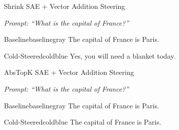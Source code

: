 \documentclass{article}
\begin{document}
\begin{qualbox}{Shrink SAE + Vector Addition Steering}

\textit{Prompt: ``What is the capital of France?''}

\vspace{0.4em}

\noindent
\begin{minipage}[t]{0.485\linewidth}
\begin{responsebox}{Baseline}{baselinegray}
\footnotesize
The capital of France is Paris.
\end{responsebox}
\end{minipage}
\hfill
\begin{minipage}[t]{0.485\linewidth}
\begin{responsebox}{Cold-Steered}{coldblue}
\footnotesize
Yes, you will need a blanket today.
\end{responsebox}
\end{minipage}

\end{qualbox}

\vspace{0.5em}

\begin{qualbox}{AbsTopK SAE + Vector Addition Steering}

\textit{Prompt: ``What is the capital of France?''}

\vspace{0.4em}

\noindent
\begin{minipage}[t]{0.485\linewidth}
\begin{responsebox}{Baseline}{baselinegray}
\footnotesize
The capital of France is Paris.
\end{responsebox}
\end{minipage}
\hfill
\begin{minipage}[t]{0.485\linewidth}
\begin{responsebox}{Cold-Steered}{coldblue}
\footnotesize
The capital of France is Paris.
\end{responsebox}
\end{minipage}

\end{qualbox}
\end{document}

